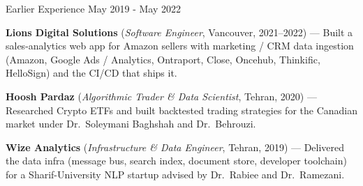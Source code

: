 \begin{cventries2}
  \cventrynew
    {Earlier Experience}
    {May 2019 - May 2022}
    {
      \begin{cvitems}
        \item {\bf Lions Digital Solutions} ({\itshape Software Engineer}, Vancouver, 2021--2022) --- Built a sales-analytics web app for Amazon sellers with marketing / CRM data ingestion (Amazon, Google Ads / Analytics, Ontraport, Close, Oncehub, Thinkific, HelloSign) and the CI/CD that ships it.
        \item {\bf Hoosh Pardaz} ({\itshape Algorithmic Trader \& Data Scientist}, Tehran, 2020) --- Researched Crypto ETFs and built backtested trading strategies for the Canadian market under Dr.\ Soleymani Baghshah and Dr.\ Behrouzi.
        \item {\bf Wize Analytics} ({\itshape Infrastructure \& Data Engineer}, Tehran, 2019) --- Delivered the data infra (message bus, search index, document store, developer toolchain) for a Sharif-University NLP startup advised by Dr.\ Rabiee and Dr.\ Ramezani.
      \end{cvitems}
    }

\end{cventries2}
